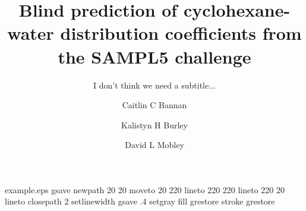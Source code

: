%
%
%
%
%
\begin{filecontents*}{example.eps}
gsave
newpath
  20 20 moveto
  20 220 lineto
  220 220 lineto
  220 20 lineto
closepath
2 setlinewidth
gsave
  .4 setgray fill
grestore
stroke
grestore
\end{filecontents*}
%
\RequirePackage{fix-cm}
%
\documentclass[smallextended]{svjour3}       %
%
\smartqed  %
%
\usepackage{graphicx}
%
%
%
%
%


\title{Blind prediction of cyclohexane-water distribution coefficients from the SAMPL5 challenge}
\thanks{NSF, green planet (their NSF), anything else?}

\subtitle{I don't think we need a subtitle...}


\author{Caitlin C Bannan         \and
        Kalistyn H Burley \and
        David L Mobley
}



